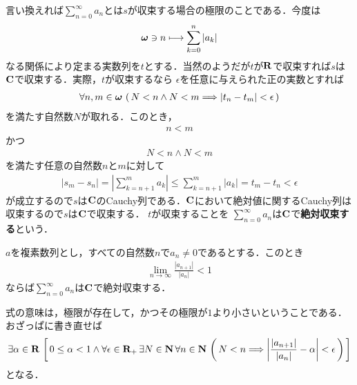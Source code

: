 	言い換えれば$\sum_{n=0}^\infty a_n$とは$s$が収束する場合の極限のことである．今度は
	\begin{align}
		{\boldsymbol \omega} \ni n \longmapsto \sum_{k=0}^n |a_k|
	\end{align}
	なる関係により定まる実数列を$t$とする．当然のようだが$t$が$\mathbf{R}$で収束すれば$s$は$\mathbf{C}$で収束する．実際，$t$が収束するなら
	$\epsilon$を任意に与えられた正の実数とすれば
	\begin{align}
		\forall n,m \in {\boldsymbol \omega}\, \left(\, N < n \wedge N < m \Longrightarrow 
		|t_n - t_m| < \epsilon\, \right)
	\end{align}
	を満たす自然数$N$が取れる．このとき，
	\begin{align}
		n < m
	\end{align}
	かつ
	\begin{align}
		N < n \wedge N < m
	\end{align}
	を満たす任意の自然数$n$と$m$に対して
	\begin{align}
		|s_m - s_n| = \left|\sum_{k=n+1}^m a_k\right| \leq \sum_{k=n+1}^m |a_k| = t_m - t_n < \epsilon
	\end{align}
	が成立するので$s$は$\mathbf{C}$のCauchy列である．$\mathbf{C}$において絶対値に関するCauchy列は収束するので$s$は$\mathbf{C}$で収束する．
	$t$が収束することを
	$\sum_{n=0}^\infty a_n$は$\mathbf{C}$で{\bf 絶対収束する}という．
	
	\begin{screen}
		\begin{thm}[d'Alembertの収束判定法]
			$a$を複素数列とし，すべての自然数$n$で$a_n \neq 0$であるとする．このとき
			\begin{align}
				\lim_{n \to \infty} \frac{|a_{n+1}|}{|a_n|} < 1
			\end{align}
			ならば$\sum_{n=0}^\infty a_n$は$\mathbf{C}$で絶対収束する．
		\end{thm}
	\end{screen}
	
	式の意味は，極限が存在して，かつその極限が$1$より小さいということである．おざっぱに書き直せば
	\begin{align}
		\exists \alpha \in \mathbf{R}\, \left[\, 
		0 \leq \alpha < 1 \wedge \forall \epsilon \in \mathbf{R}_+\, \exists N \in \mathbf{N}\, \forall n \in \mathbf{N}\,
		\left(\, N < n \Longrightarrow \left|\frac{|a_{n+1}|}{|a_n|} - \alpha\right| < \epsilon\, \right)\, \right]
	\end{align}
	となる．
	
